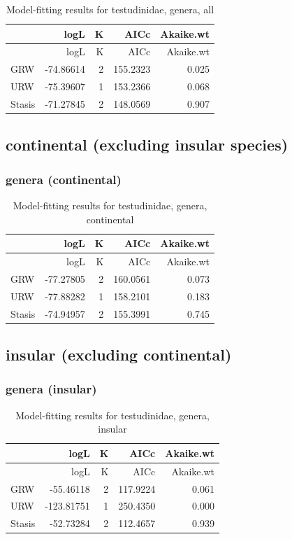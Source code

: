 \documentclass[]{article}
\begin{document}
\begin{longtable}[]{@{}lrrrr@{}}
\caption{Model-fitting results for testudinidae, genera,
all}\tabularnewline
\toprule
& logL & K & AICc & Akaike.wt\tabularnewline
\midrule
\endfirsthead
\toprule
& logL & K & AICc & Akaike.wt\tabularnewline
\midrule
\endhead
GRW & -74.86614 & 2 & 155.2323 & 0.025\tabularnewline
URW & -75.39607 & 1 & 153.2366 & 0.068\tabularnewline
Stasis & -71.27845 & 2 & 148.0569 & 0.907\tabularnewline
\bottomrule
\end{longtable}

\newpage

\subsection{continental (excluding insular
species)}\label{continental-excluding-insular-species}

\subsubsection{genera (continental)}\label{genera-continental}

\begin{longtable}[]{@{}lrrrr@{}}
\caption{Model-fitting results for testudinidae, genera,
continental}\tabularnewline
\toprule
& logL & K & AICc & Akaike.wt\tabularnewline
\midrule
\endfirsthead
\toprule
& logL & K & AICc & Akaike.wt\tabularnewline
\midrule
\endhead
GRW & -77.27805 & 2 & 160.0561 & 0.073\tabularnewline
URW & -77.88282 & 1 & 158.2101 & 0.183\tabularnewline
Stasis & -74.94957 & 2 & 155.3991 & 0.745\tabularnewline
\bottomrule
\end{longtable}

\newpage

\subsection{insular (excluding
continental)}\label{insular-excluding-continental}

\subsubsection{genera (insular)}\label{genera-insular}

\begin{longtable}[]{@{}lrrrr@{}}
\caption{Model-fitting results for testudinidae, genera,
insular}\tabularnewline
\toprule
& logL & K & AICc & Akaike.wt\tabularnewline
\midrule
\endfirsthead
\toprule
& logL & K & AICc & Akaike.wt\tabularnewline
\midrule
\endhead
GRW & -55.46118 & 2 & 117.9224 & 0.061\tabularnewline
URW & -123.81751 & 1 & 250.4350 & 0.000\tabularnewline
Stasis & -52.73284 & 2 & 112.4657 & 0.939\tabularnewline
\bottomrule
\end{longtable}
\end{document}
